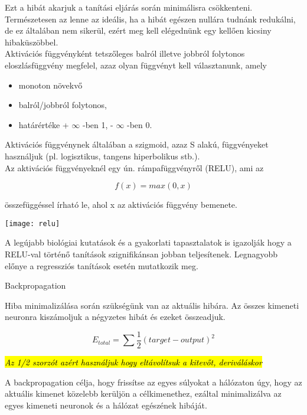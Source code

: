 Ezt a hibát akarjuk a tanítási eljárás során minimálisra csökkenteni. Természetesen az lenne az ideális, ha a hibát egészen nullára tudnánk redukálni, de ez általában nem sikerül, ezért meg kell elégednünk egy kellően kicsiny hibaküszöbbel.\\

Aktivációs függvényként tetszőleges balról illetve jobbról folytonos eloszlásfüggvény megfelel, azaz olyan függvényt kell választanunk, amely

\begin{itemize}
\item monoton növekvő
\item balról/jobbról folytonos,
\item határértéke + $\infty$ -ben 1, - $\infty$ -ben 0.
\end{itemize}

Aktivációs függvénynek általában a szigmoid, azaz S alakú, függvényeket használjuk (pl. logisztikus, tangens hiperbolikus stb.).\\

Az aktivációs függvényeknél egy ún. rámpafüggvényről (RELU), ami az

\[ f(x) = max(0,x) \]

összefüggéssel írható le, ahol x az aktivációs függvény bemenete.\\

\begin{center}
\texttt{[image: relu]}
\end{center}

A legújabb biológiai kutatások és a gyakorlati tapasztalatok is igazolják hogy a RELU-val történő tanítások szignifikánsan jobban teljesítenek. Legnagyobb előnye a regressziós tanítások esetén mutatkozik meg.

\begin{flushleft}
{\Large Backpropagation}\\
\end{flushleft}

Hiba minimalizálása során szükségünk van az aktuális hibára. Az összes kimeneti neuronra kiszámoljuk a négyzetes hibát és ezeket összeadjuk.

\[ E_{total} = \sum \dfrac{1}{2}(target - output)^2\]

\textit{\hl{Az 1/2 szorzót azért használjuk hogy eltávolítsuk a kitevőt, deriváláskor}
}

A backpropagation célja, hogy frissítse az egyes súlyokat a hálózaton úgy, hogy az aktuális kimenet közelebb kerüljön a célkimenethez, ezáltal minimalizálva az egyes kimeneti neuronok és a hálózat egészének hibáját.\\

